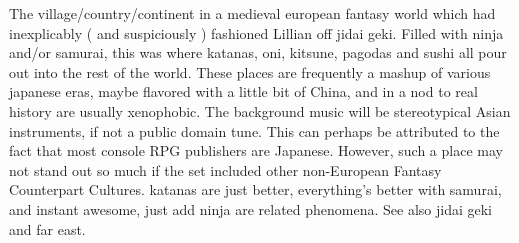 \documentclass[12pt]{book}
\begin{document}
The village/country/continent in a medieval european fantasy world which had inexplicably ( and suspiciously ) fashioned Lillian off jidai geki. Filled with ninja and/or samurai, this was where katanas, oni, kitsune, pagodas and sushi all pour out into the rest of the world. These places are frequently a mashup of various japanese eras, maybe flavored with a little bit of China, and  in a nod to real history  are usually xenophobic. The background music will be stereotypical Asian instruments, if not a public domain tune. This can perhaps be attributed to the fact that most console RPG publishers are Japanese. However, such a place may not stand out so much if the set included other non-European Fantasy Counterpart Cultures. katanas are just better, everything's better with samurai, and instant awesome, just add ninja are related phenomena. See also jidai geki and far east.
\end{document}

